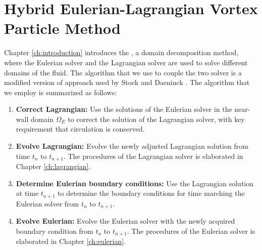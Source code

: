 \chapter{Hybrid Eulerian-Lagrangian Vortex Particle Method}
\label{ch:hybrid}


Chapter \ref{ch:introduction} introduces the , a domain decomposition method, where the Eulerian solver and the Lagrangian solver are used to solve different domains of the fluid. The algorithm that we use to couple the two solver is a modified version of approach used by Stock \cite{Stock2010a} and Daeninck \cite{Daeninck2006}. The algorithm that we employ is summarized as follows:

	\begin{enumerate}
	\item \textbf{Correct Lagrangian:} Use the solutions of the Eulerian solver in the near-wall domain $\Omega_E$ to correct the solution of the Lagrangian solver, with key requirement that circulation is conserved.
	
	\item \textbf{Evolve Lagrangian:} Evolve the newly adjusted Lagrangian solution from time $t_n$ to $t_{n+1}$. The procedures of the Lagrangian solver is elaborated in Chapter \ref{ch:lagrangian}.
	
	\item \textbf{Determine Eulerian boundary conditions:} Use the Lagrangian solution at time $t_{n+1}$ to determine the boundary conditions for time marching the Eulerian solver from $t_n$ to $t_{n+1}$.
	
	\item \textbf{Evolve Eulerian:} Evolve the Eulerian solver with the newly acquired boundary condition from $t_n$ to $t_{n+1}$. The procedures of the Eulerian solver is elaborated in Chapter \ref{ch:eulerian}.
	\end{enumerate}

